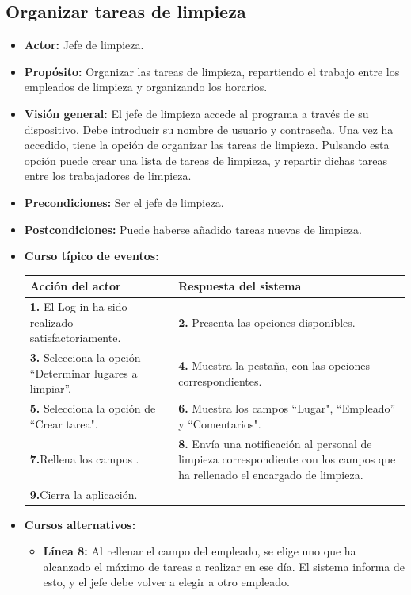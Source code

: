 \documentclass[spanish,a4paper,11pt, twoside]{report}	%
\begin{document}
	\subsection{Organizar tareas de limpieza}
			\begin{itemize}
			\item \textbf{Actor: }Jefe de limpieza.
			\item \textbf{Propósito: }Organizar las tareas de limpieza, repartiendo el trabajo entre los empleados de limpieza y organizando los horarios. 		
			\item \textbf{Visión general: }El jefe de limpieza accede al programa a través de su dispositivo. Debe introducir su nombre de usuario y contraseña. Una vez ha accedido, tiene la opción de organizar las tareas de limpieza. Pulsando esta opción puede crear una lista de tareas de limpieza, y repartir dichas tareas entre los trabajadores de limpieza. 
			\item \textbf{Precondiciones:} Ser el jefe de limpieza.
			\item \textbf{Postcondiciones:} Puede haberse añadido tareas nuevas de limpieza.
			\item \textbf{Curso típico de eventos:} \\
\begin{tabular}{|p{6cm}||p{6cm}|}
				\hline
				\textbf{Acción del actor} & \textbf{Respuesta del sistema} \\ \hline \hline
				\textbf{1.} El Log in ha sido realizado satisfactoriamente. & \textbf{2.} Presenta las opciones disponibles.\\ \hline
				\textbf{3.} Selecciona la opción “Determinar lugares a limpiar”. & \textbf{4.} Muestra la pestaña, con las opciones correspondientes. \\ \hline
				\textbf{5.} Selecciona la opción de “Crear tarea".	& \textbf{6.} Muestra los campos “Lugar", “Empleado'' y “Comentarios". \\ \hline
				\textbf{7.}Rellena los campos . & \textbf{8.} Envía una notificación al personal de limpieza correspondiente con los campos que ha rellenado el encargado de limpieza.\\ \hline
				\textbf{9.}Cierra la aplicación. & \textbf{} \\ \hline
			\end{tabular}

			\item \textbf{Cursos alternativos:} 
				\begin {itemize}
					
					\item \textbf{Línea 8: } Al rellenar el campo del empleado, se elige uno que ha alcanzado el máximo de tareas a realizar en ese día. El sistema informa de esto, y el jefe debe volver a elegir a otro empleado.
				\end {itemize}
			\end{itemize}%
\end{document}

